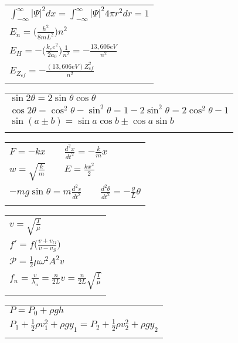 \documentclass[a4paper]{article}
\begin{document}
\begin{tabular}{|l|}
\hline

$ \int_{-\infty}^{\infty} | \Psi |^2 dx = \int_{-\infty}^{\infty} | \Psi |^2 4\pi r^2 dr = 1 $\\
$ E_n = \big( \frac{h^2}{8mL^2} \big) n^2 $ \\
$ E_H = - \big( \frac{k_e e^2}{2a_0}\big) \frac{1}{n^2} = - \frac{13,606 eV}{n^2} $\\
$ E_{Z_{ef}} = - \frac{ (13,606 eV) Z_{ef}^2}{n^2} $\\
\\

\hline
\end{tabular}
\begin{tabular}{|l|}
\hline

$ \sin 2\theta = 2 \sin \theta \cos \theta $ \\
$ \cos 2\theta = \cos^2 \theta - \sin^2 \theta = 1 - 2 \sin^2 \theta = 2 \cos^2 \theta - 1 $\\
$ \sin ( a \pm b) = \sin a \cos b \pm \cos a \sin b $\\

\\
\hline
\end{tabular}

\begin{tabular}{|l|}
\hline

$ F = -kx \qquad \frac{d^2x}{dt^2} = - \frac{k}{m}x $\\
$ w = \sqrt{\frac{k}{m}} \qquad E = \frac{kx^2}{2} $ \\
$ -mg \sin \theta = m \frac{d^2 s}{dt^2} \qquad \frac{d^2\theta}{dt^2} = - \frac{g}{L}\theta $ \\
\\
\hline
\end{tabular}
\begin{tabular}{|l|}
\hline
$ v = \sqrt{\frac{T}{\mu}} $\\
$ f' = f \Big( \frac{v + v_O}{v - v_S} \Big) $\\
$ \mathscr{P} = \frac{1}{2}\mu \omega^2A^2v $\\
$ f_n = \frac{v}{\lambda_n} = \frac{n}{2L}v = \frac{n}{2L}\sqrt{\frac{T}{\mu}} $\\
\\
\hline
\end{tabular}
\begin{tabular}{|l|}
\hline
$ P = P_0 + \rho g h $\\
$ P_1 + \frac{1}{2}\rho v_1^2 + \rho g y_1 = P_2 + \frac{1}{2}\rho v_2^2 + \rho g y_2 $\\
\\
\hline
\end{tabular}
\end{document}
